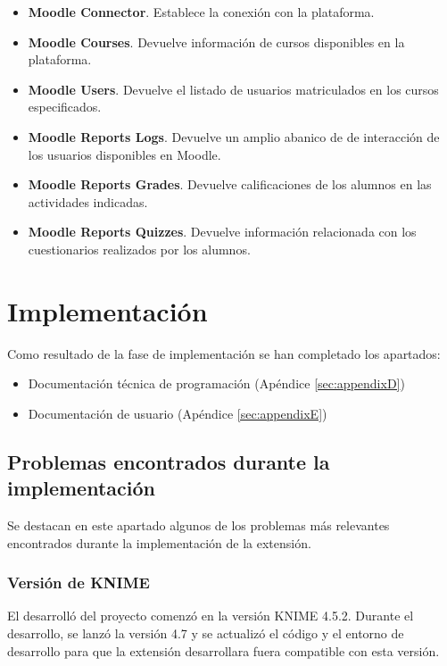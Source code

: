 \begin{itemize}
	\item \textbf{Moodle Connector}. Establece la conexión con la plataforma. 
	\item \textbf{Moodle Courses}. Devuelve información de cursos disponibles en la plataforma. 
	\item \textbf{Moodle Users}. Devuelve el listado de usuarios matriculados en los cursos especificados. 
	\item \textbf{Moodle Reports Logs}. Devuelve un amplio abanico de  de interacción de los usuarios disponibles en Moodle. 
	\item \textbf{Moodle Reports Grades}. Devuelve calificaciones de los alumnos en las actividades indicadas. 
	\item \textbf{Moodle Reports Quizzes}. Devuelve información relacionada con los cuestionarios realizados por los alumnos. 
\end{itemize}


\newpage
\section{Implementación}

Como resultado de la fase de implementación se han completado los apartados: 

\begin{itemize}
	\item Documentación técnica de programación (Apéndice \ref{sec:appendixD})
	\item Documentación de usuario (Apéndice \ref{sec:appendixE})
\end{itemize}


\subsection{Problemas encontrados durante la implementación}

Se destacan en este apartado algunos de los problemas más relevantes encontrados durante la implementación de la extensión. 


\subsubsection{Versión de KNIME}

El desarrolló del proyecto comenzó en la versión KNIME 4.5.2. Durante el desarrollo, se lanzó la versión 4.7 
y se actualizó el código y el entorno de desarrollo para que la extensión desarrollara fuera compatible con 
esta versión. 

